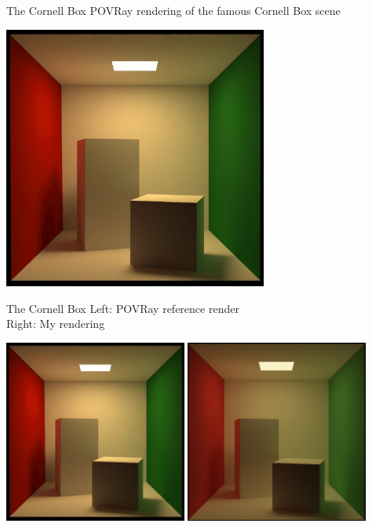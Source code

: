 \documentclass{beamer}
\begin{document}
\begin{frame}{The Cornell Box}
    POVRay rendering of the famous Cornell Box scene
    \begin{center}
        \includegraphics[width=0.65\textwidth]{../img/povray.jpg}
    \end{center}
\end{frame}

\begin{frame}{The Cornell Box}
    Left: POVRay reference render\\
    Right: My rendering
    \begin{center}
        \includegraphics[width=0.45\textwidth]{../img/povray.jpg}
        \includegraphics[width=0.45\textwidth]{../img/cornell_4.png}
    \end{center}
\end{frame}
\end{document}
